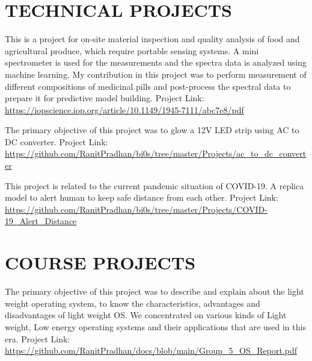 \documentclass[11pt,a4paper,sans]{moderncv}        %
\begin{document}
\section{TECHNICAL PROJECTS}

{This is a project for on-site material inspection and quality analysis of food and agricultural produce, which require portable sensing systems. A mini spectrometer is used for the measurements and the spectra data is analyzed using machine learning. My contribution in this project was to perform measurement of different compositions of medicinal pills and post-process the spectral data to prepare it for predictive model building.{\newline}
Project Link: {\newline}
\url{https://iopscience.iop.org/article/10.1149/1945-7111/abc7e8/pdf}}{}

{The primary objective of this project was to glow a 12V LED strip using AC to DC converter.{\newline} 
Project Link: {\newline}
\url{https://github.com/RanitPradhan/bi0s/tree/master/Projects/ac_to_dc_converter}}{}

{This project is related to the current pandemic situation of COVID-19. A replica model to alert human to keep safe distance from each other. {\newline} 
Project Link: {\newline}
\url{https://github.com/RanitPradhan/bi0s/tree/master/Projects/COVID-19_Alert_Distance}}{}

\break
\section{COURSE PROJECTS}

{The primary objective of this project was to  describe  and  explain about the light weight operating system, to know the characteristics, advantages and disadvantages of light weight OS. We concentrated on various kinds of Light weight, Low energy operating  systems and  their  applications  that  are used in this era.{\newline} 
Project Link:{\newline}
\url{https://github.com/RanitPradhan/docs/blob/main/Group_5_OS_Report.pdf}}{}
\end{document}
